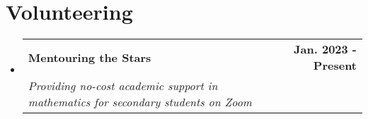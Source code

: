 \documentclass[letterpaper,11pt]{article}
\makeatletter
\newcommand{\resumeItem}[1]{
  \item\small{
    {#1 \vspace{-2pt}}
  }
}
\newcommand{\resumeSubheading}[4]{
  \vspace{-2pt}\item
    \begin{tabular*}{1.0\textwidth}[t]{l@{\extracolsep{\fill}}r}
      \textbf{#1} & \textbf{\small #2} \\
      \textit{\small#3} & \textit{\small #4} \\
    \end{tabular*}\vspace{-7pt}
}
\newcommand{\resumeProjectHeading}[2]{
    \item
    \begin{tabular*}{1.001\textwidth}{l@{\extracolsep{\fill}}r}
      \small#1 & \textbf{\small #2}\\
    \end{tabular*}\vspace{-7pt}
}
\newcommand{\resumeSubHeadingListStart}{\begin{itemize}[leftmargin=0.0in, label={}]}
\newcommand{\resumeSubHeadingListEnd}{\end{itemize}}
\newcommand{\resumeItemListStart}{\begin{itemize}}
\newcommand{\resumeItemListEnd}{\end{itemize}\vspace{-5pt}}
\makeatother
\begin{document}
\section{Volunteering}
\resumeSubHeadingListStart
\resumeSubheading{Mentouring the Stars}{Jan. 2023 - Present}{Providing no-cost academic support in mathematics for secondary students on Zoom}{}
\resumeSubHeadingListEnd



\end{document}
